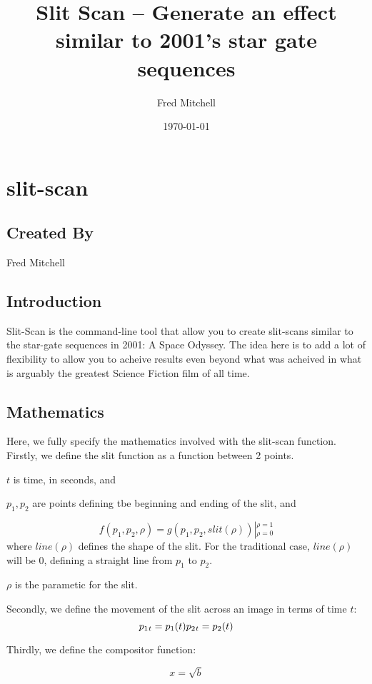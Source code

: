 \documentclass[letterpaper, 11pt]{article}
\author{Fred Mitchell}
\date{\today}
\title{Slit Scan -- Generate an effect similar to 2001's star gate sequences}
\begin{document}
\maketitle
\tableofcontents


\section{slit-scan}
\label{sec:org54b5b2c}
\subsection{Created By}
\label{sec:org527e18f}
Fred Mitchell
\subsection{Introduction}
\label{sec:org12f709f}
Slit-Scan is the command-line tool that allow you to create slit-scans similar to
the star-gate sequences in 2001: A Space Odyssey. The idea here is to add a lot of flexibility
to allow you to acheive results even beyond what was acheived in what is arguably the greatest
Science Fiction film of all time.
\subsection{Mathematics}
\label{sec:orgc89aa27}
Here, we fully specify the mathematics involved with the slit-scan function.
Firstly, we define the slit function as a function between 2 points.

\item $t$ is time, in seconds, and
\item $p_1, p_2$
are points defining tbe beginning and ending of the slit, and
\item $$
 f(p_1, p_2, \rho) = g(p_1, p_2, slit(\rho)) \left|_{\rho=0}^{\rho=1}
$$
where \(line(\rho)\) defines the shape of the slit. For the traditional case,
\(line(\rho)\) will be \(0\), defining a straight line from \(p_1\) to \(p_2\).

\(\rho\) is the parametic for the slit.

Secondly, we define the movement of the slit across an image in terms of time \(t\):
\begin{dmath*}
    p_1{_t} = p_1(t) \\
    p_2{_t} = p_2(t)
\end{dmath*}

Thirdly, we define the compositor function:


\begin{equation}
x=\sqrt{b}
\end{equation}
\end{document}
